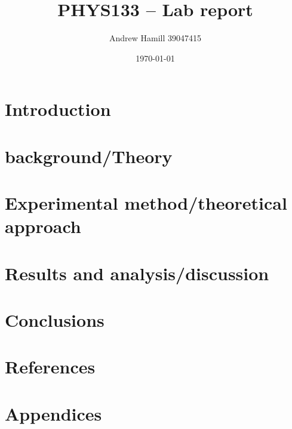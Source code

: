 \documentclass[12pt]{article}
\begin{document}
    \title{PHYS133 -- Lab report}
    \author{Andrew Hamill 39047415}
    \date{\today}
    \maketitle

    \begin{abstract}
    \end{abstract}

    \section{Introduction}
    \section{background/Theory}
    \section{Experimental method/theoretical approach}
    \section{Results and analysis/discussion}
    \section{Conclusions}
    \section{References}
    \section{Appendices}
    
     
\end{document}
